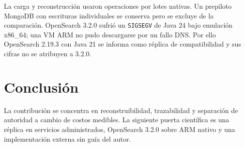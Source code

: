 \documentclass[11pt]{article}
\begin{document}
La carga y reconstrucción usaron operaciones por lotes nativas. Un prepiloto MongoDB con escrituras individuales se conserva pero se excluye de la comparación. OpenSearch 3.2.0 sufrió un \texttt{SIGSEGV} de Java 24 bajo emulación x86\_64; una VM ARM no pudo descargarse por un fallo DNS. Por ello OpenSearch 2.19.3 con Java 21 se informa como réplica de compatibilidad y sus cifras no se atribuyen a 3.2.0.

\section*{Conclusión}
La contribución se concentra en reconstruibilidad, trazabilidad y separación de autoridad a cambio de costos medibles. La siguiente puerta científica es una réplica en servicios administrados, OpenSearch 3.2.0 sobre ARM nativo y una implementación externa sin guía del autor.
\end{document}
